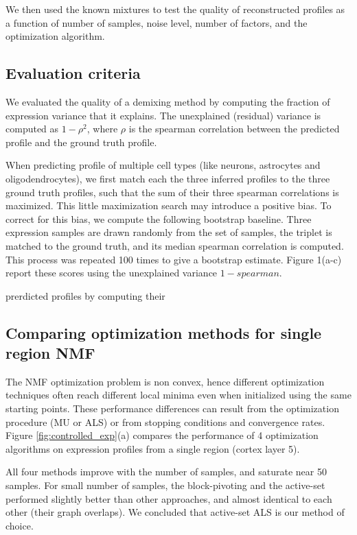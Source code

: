 We then used the known mixtures to test the quality of reconstructed profiles as a function of number of samples, noise level, number of factors, and the optimization algorithm. 


\subsection{Evaluation criteria}
We evaluated the quality of a demixing method by computing the fraction of expression variance that it explains. The unexplained (residual) variance is computed as $1-\rho^2$, where $\rho$ is the spearman correlation between the predicted profile and the ground truth profile.

When predicting profile of multiple cell types (like neurons, astrocytes and oligodendrocytes), we first match each the three inferred profiles to the three ground truth profiles, such that the sum of their three spearman correlations is maximized. This little maximization search may introduce a positive bias. To correct for this bias, we compute the following bootstrap baseline. Three expression samples are drawn randomly from the set of samples, the triplet is matched to the ground truth, and its median spearman correlation is computed. This process was repeated 100 times to give a bootstrap estimate. Figure 1(a-c) report these scores using the unexplained variance $1 - spearman$.


prerdicted profiles by computing their %


\subsection{Comparing optimization methods for single region NMF}
The NMF optimization problem is non convex, hence different optimization techniques often reach different local minima even when initialized using the same starting points. These performance differences can result from the optimization procedure (MU or ALS) or from stopping conditions and convergence rates. Figure \ref{fig:controlled_exp}(a) compares the performance of 4 optimization algorithms on expression profiles from a single region (cortex layer 5). 

All four methods improve with the number of samples, and saturate near 50 samples. For small number of samples, the block-pivoting and the active-set performed slightly better than other approaches, and almost identical to each other (their graph overlaps). We concluded that active-set ALS is our method of choice.

